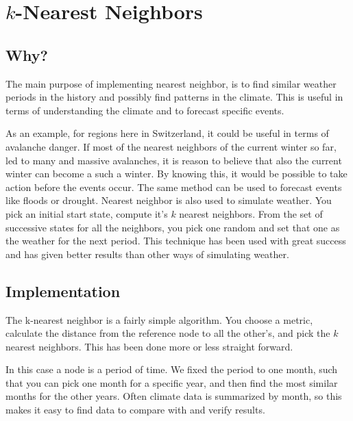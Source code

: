 \section{$k$-Nearest Neighbors}

\subsection{Why?} %

The main purpose of implementing nearest neighbor, is to find similar weather
periods in the history and possibly find patterns in the climate. This is useful
in terms of understanding the climate and to forecast specific events. 

As an example, for regions here in Switzerland, it could be useful in terms of avalanche
danger. If most of the nearest neighbors of the current winter so far, led to
many and massive avalanches, it is reason to believe that also the current
winter can become a such a winter. By knowing this, it would be possible to take
action before the events occur. The same method can be used to forecast events
like floods or drought. Nearest neighbor is also used to simulate weather. You pick
an initial start state, compute it's $k$ nearest neighbors. From the set of 
successive states for all the neighbors, you pick one random and set that one as
the weather for the next period. This technique has been used with great success
and has given better results than other ways of simulating weather. 



\subsection{Implementation} %

The k-nearest neighbor is a fairly simple algorithm. You choose a metric,
calculate the distance from the reference node to all the other's, and pick the
$k$ nearest neighbors. This has been done more or less straight forward.

In this case a node is a period of time. We fixed the period to one month, such
that you can pick one month for a specific year, and then find the most similar
months for the other years. Often climate data is summarized by month, so this
makes it easy to find data to compare with and verify results.

